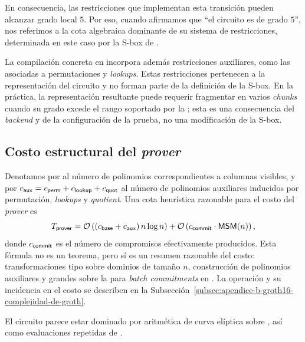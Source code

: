 En consecuencia, las restricciones que implementan esta transición pueden alcanzar grado local $5$. Por eso, cuando afirmamos que ``el circuito \MidnightSTMCircuit es de grado $5$'', nos referimos a la cota algebraica dominante de su sistema de restricciones, determinada en este caso por la S-box de \MidnightPoseidonHash.

La compilación concreta en \HaloTwo incorpora además restricciones auxiliares, como las asociadas a permutaciones y \textit{lookups}. Estas restricciones pertenecen a la representación del circuito y no forman parte de la definición de la S-box. En la práctica, la representación resultante puede requerir fragmentar \QuotientPoly en varios \textit{chunks} cuando su grado excede el rango soportado por la \SRS; esta es una consecuencia del \textit{backend} y de la configuración de la prueba, no una modificación de la S-box.

\subsection{Costo estructural del \textit{prover}}
\label{subsec:stm-halo2-y-complejidad-costo-estructural-del-prover}

Denotamos por \BaseCols al número de polinomios correspondientes a columnas visibles, y por $c_{\mathsf{aux}} = c_{\mathsf{perm}} + c_{\mathsf{lookup}} + c_{\mathsf{quot}}$ al número de polinomios auxiliares inducidos por permutación, \textit{lookups} y \textit{quotient}. Una cota heurística razonable para el costo del \textit{prover} es
$$T_{\mathsf{prover}} = \mathcal{O}\left((c_{\mathsf{base}} + c_{\mathsf{aux}}) \, n \log n\right) +  \mathcal{O}\left(c_{\mathsf{commit}} \cdot \textsf{MSM}(n)\right),$$
donde $c_{\mathsf{commit}}$ es el número de compromisos \KZG efectivamente producidos. Esta fórmula no es un teorema, pero sí es un resumen razonable del costo: transformaciones tipo \FFT sobre dominios de tamaño $n$, construcción de polinomios auxiliares y \MSM grandes sobre la \SRS para \textit{batch commitments} en \KZG. La operación \MSM y su incidencia en el costo se describen en la Subsección~\ref{subsec:apendice-b-groth16-complejidad-de-groth}.

El circuito \MidnightSTMCircuit parece estar dominado por aritmética de curva elíptica sobre \Jubjub, así como evaluaciones repetidas de \PoseidonHash.
